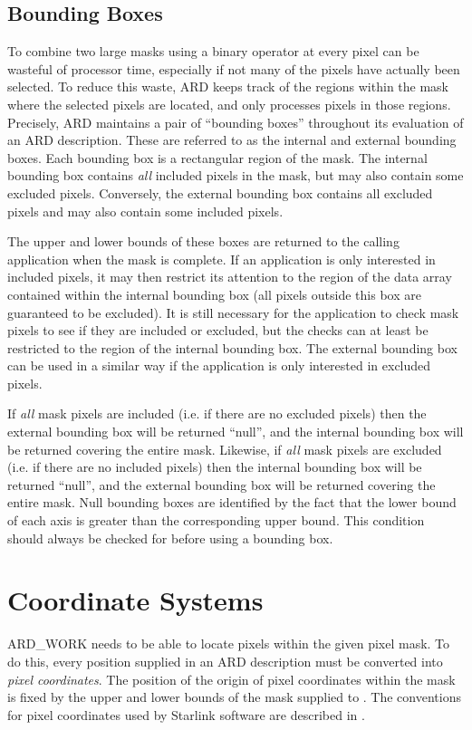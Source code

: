 \documentclass[11pt]{starlink}
\begin{document}
\subsection{\label{SEC:BBOX}Bounding Boxes}
To combine two large masks using a binary operator at every pixel can be
wasteful of processor time, especially if not many of the pixels have actually
been selected. To reduce this waste, ARD keeps track of the regions within the
mask where the selected pixels are located, and only processes pixels in those
regions. Precisely, ARD maintains a pair of ``bounding boxes'' throughout its
evaluation of an ARD description. These are referred to as the internal and
external bounding boxes. Each bounding box is a rectangular region of the mask.
The internal bounding box contains \emph{all} included pixels in the mask, but
may also contain some excluded pixels. Conversely, the external bounding box
contains all excluded pixels and may also contain some included pixels.

The upper and lower bounds of these boxes are returned to the calling
application when the mask is complete. If an application is only interested in
included pixels, it may then restrict its attention to the region of the data
array contained within the internal bounding box (all pixels outside this box
are guaranteed to be excluded). It is still necessary for the application to
check mask pixels to see if they are included or excluded, but the checks can
at least be restricted to the region of the internal bounding box. The external
bounding box can be used in a similar way if the application is only interested
in excluded pixels.

If \emph{all} mask pixels are included (i.e. if there are no excluded pixels)
then the external bounding box will be returned ``null'', and the internal
bounding box will be returned covering the entire mask. Likewise, if \emph{all}
mask pixels are excluded (i.e. if there are no included pixels) then the
internal bounding box will be returned ``null'', and the external bounding box
will be returned covering the entire mask. Null bounding boxes are identified by
the fact that the lower bound of each axis is greater than the corresponding
upper bound. This condition should always be checked for before using a
bounding box.

\section{\label{SEC:COORD}Coordinate Systems}
ARD\_WORK needs to be able to locate pixels within the given pixel mask.
To do this, every position supplied in an ARD description must be
converted into \emph{pixel coordinates}. The position of the origin of
pixel coordinates within the mask is fixed by the upper and lower bounds
of the mask supplied to . The conventions
for pixel coordinates used by Starlink software are described in
.
\end{document}
